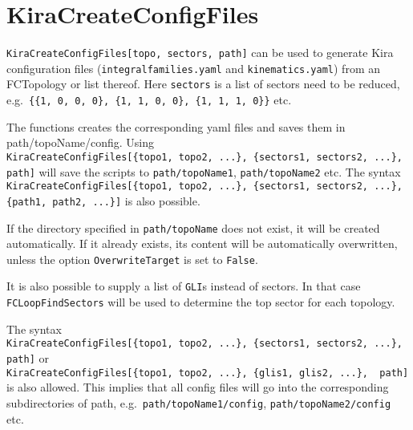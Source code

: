 \documentclass[../FeynHelpersManual.tex]{subfiles}
\begin{document}
\begin{Shaded}
\begin{Highlighting}[]
 
\end{Highlighting}
\end{Shaded}

\hypertarget{kiracreateconfigfiles}{
\section{KiraCreateConfigFiles}\label{kiracreateconfigfiles}}

\texttt{KiraCreateConfigFiles[\allowbreak{}topo,\ \allowbreak{}sectors,\ \allowbreak{}path]}
can be used to generate Kira configuration files
(\texttt{integralfamilies.yaml} and \texttt{kinematics.yaml}) from an
FCTopology or list thereof. Here \texttt{sectors} is a list of sectors
need to be reduced,
e.g.~\texttt{\{\allowbreak{}\{\allowbreak{}1,\ \allowbreak{}0,\ \allowbreak{}0,\ \allowbreak{}0\},\ \allowbreak{}\{\allowbreak{}1,\ \allowbreak{}1,\ \allowbreak{}0,\ \allowbreak{}0\},\ \allowbreak{}\{\allowbreak{}1,\ \allowbreak{}1,\ \allowbreak{}1,\ \allowbreak{}0\}\}}
etc.

The functions creates the corresponding yaml files and saves them in
path/topoName/config. Using
\texttt{KiraCreateConfigFiles[\allowbreak{}\{\allowbreak{}topo1,\ \allowbreak{}topo2,\ \allowbreak{}...\},\ \allowbreak{}\{\allowbreak{}sectors1,\ \allowbreak{}sectors2,\ \allowbreak{}...\},\ \allowbreak{} path]}
will save the scripts to \texttt{path/topoName1},
\texttt{path/topoName2} etc. The syntax
\texttt{KiraCreateConfigFiles[\allowbreak{}\{\allowbreak{}topo1,\ \allowbreak{}topo2,\ \allowbreak{}...\},\ \allowbreak{}\{\allowbreak{}sectors1,\ \allowbreak{}sectors2,\ \allowbreak{}...\},\ \allowbreak{} \{\allowbreak{}path1,\ \allowbreak{}path2,\ \allowbreak{}...\}]}
is also possible.

If the directory specified in \texttt{path/topoName} does not exist, it
will be created automatically. If it already exists, its content will be
automatically overwritten, unless the option \texttt{OverwriteTarget} is
set to \texttt{False}.

It is also possible to supply a list of \texttt{GLI}s instead of
sectors. In that case \texttt{FCLoopFindSectors} will be used to
determine the top sector for each topology.

The syntax
\texttt{KiraCreateConfigFiles[\allowbreak{}\{\allowbreak{}topo1,\ \allowbreak{}topo2,\ \allowbreak{}...\},\ \allowbreak{}\{\allowbreak{}sectors1,\ \allowbreak{}sectors2,\ \allowbreak{}...\},\ \allowbreak{}path]}
or
\texttt{KiraCreateConfigFiles[\allowbreak{}\{\allowbreak{}topo1,\ \allowbreak{}topo2,\ \allowbreak{}...\},\ \allowbreak{}\{\allowbreak{}glis1,\ \allowbreak{}glis2,\ \allowbreak{}...\},\ \allowbreak{} path]}
is also allowed. This implies that all config files will go into the
corresponding subdirectories of path,
e.g.~\texttt{path/topoName1/config}, \texttt{path/topoName2/config} etc.
\end{document}

